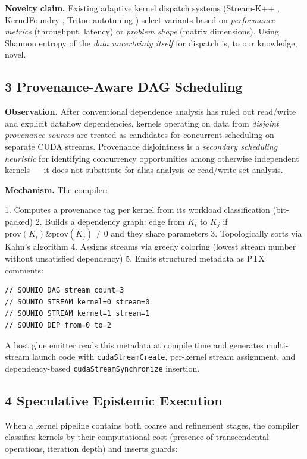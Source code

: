 \documentclass[11pt]{article}
\begin{document}
{{\textbf{Novelty claim.} Existing adaptive kernel dispatch systems (Stream-K++ \cite{streamkpp2024}, KernelFoundry \cite{kernelfoundry2026}, Triton autotuning \cite{triton2019}) select variants based on \emph{performance metrics} (throughput, latency) or \emph{problem shape} (matrix dimensions). Using Shannon entropy of the \emph{data uncertainty itself} for dispatch is, to our knowledge, novel.

\subsection{3 Provenance-Aware DAG Scheduling}

\textbf{Observation.} After conventional dependence analysis has ruled out read/write and explicit dataflow dependencies, kernels operating on data from \emph{disjoint provenance sources} are treated as candidates for concurrent scheduling on separate CUDA streams. Provenance disjointness is a \emph{secondary scheduling heuristic} for identifying concurrency opportunities among otherwise independent kernels --- it does not substitute for alias analysis or read/write-set analysis.

\textbf{Mechanism.} The compiler:

1. Computes a provenance tag per kernel from its workload classification (bit-packed)
2. Builds a dependency graph: edge from $K_i$ to $K_j$ if $\text{prov}(K_i) \mathbin{\&} \text{prov}(K_j) \neq 0$ and they share parameters
3. Topologically sorts via Kahn's algorithm
4. Assigns streams via greedy coloring (lowest stream number without unsatisfied dependency)
5. Emits structured metadata as PTX comments:

\begin{lstlisting}[basicstyle=\ttfamily\small]
// SOUNIO_DAG stream_count=3
// SOUNIO_STREAM kernel=0 stream=0
// SOUNIO_STREAM kernel=1 stream=1
// SOUNIO_DEP from=0 to=2
\end{lstlisting}

A host glue emitter reads this metadata at compile time and generates multi-stream launch code with \texttt{cudaStreamCreate}, per-kernel stream assignment, and dependency-based \texttt{cudaStreamSynchronize} insertion.

\subsection{4 Speculative Epistemic Execution}

When a kernel pipeline contains both coarse and refinement stages, the compiler classifies kernels by their computational cost (presence of transcendental operations, iteration depth) and inserts guards:

}}
\end{document}
